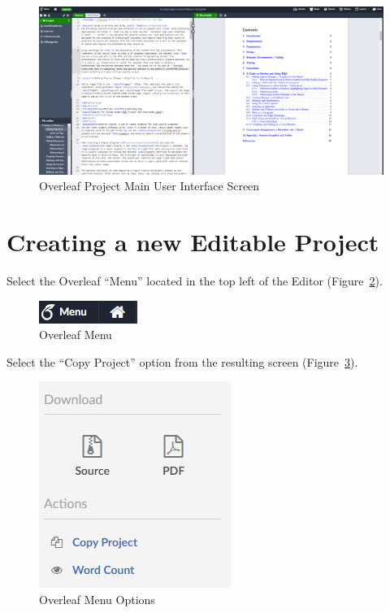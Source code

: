 \documentclass[12pt]{article}
\begin{document}
\begin{figure}[H]
\begin{center}
\includegraphics[width=.85\linewidth]{04-overleaf-NewProject.png}
\caption{Overleaf Project Main User Interface Screen} \label{fig:04:OverleafInterface}
\end{center}
\end{figure}

\clearpage
\section{Creating a new Editable Project}
Select the Overleaf ``Menu'' located in the top left of the Editor (Figure~\ref{fig:05:OverleafMenu}).

\begin{figure}[H]
\begin{center}
\includegraphics[width=.35\linewidth]{05-navigateToHome-ProjectsScreen.png}
\caption{Overleaf Menu} \label{fig:05:OverleafMenu}
\end{center}
\end{figure}

Select the ``Copy Project'' option from the resulting screen (Figure~\ref{fig:08:MenuOptions}).

\begin{figure}[H]
\begin{center}
\includegraphics[width=.35\linewidth]{08-FromMenu-GetWordCount.png}
\caption{Overleaf Menu Options} \label{fig:08:MenuOptions}
\end{center}
\end{figure}
\end{document}
